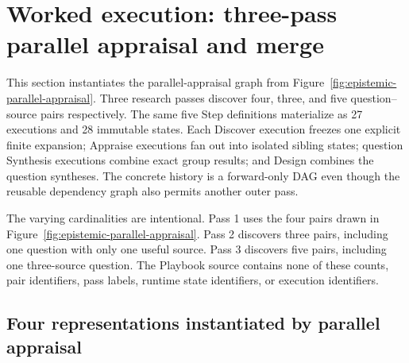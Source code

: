 \documentclass[11pt]{article}
\begin{document}
\clearpage
\section{Worked execution: three-pass parallel appraisal and merge}

\begin{summarybox}
This section instantiates the parallel-appraisal graph from
Figure~\ref{fig:epistemic-parallel-appraisal}. Three research passes discover
four, three, and five question--source pairs respectively. The same five Step
definitions materialize as 27 executions and 28 immutable states. Each
Discover execution freezes one explicit finite expansion; Appraise executions
fan out into isolated sibling states; question Synthesis executions combine
exact group results; and Design combines the question syntheses. The concrete
history is a forward-only DAG even though the reusable dependency graph also
permits another outer pass.
\end{summarybox}

The varying cardinalities are intentional. Pass 1 uses the four pairs drawn in
Figure~\ref{fig:epistemic-parallel-appraisal}. Pass 2 discovers three pairs,
including one question with only one useful source. Pass 3 discovers five
pairs, including one three-source question. The Playbook source contains none
of these counts, pair identifiers, pass labels, runtime state identifiers, or
execution identifiers.

\subsection{Four representations instantiated by parallel appraisal}
\end{document}
